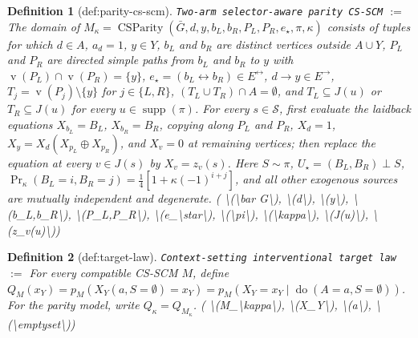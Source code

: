 \documentclass{article}
\newtheorem{definition}{Definition}
\begin{document}
\begin{definition}[def:parity-cs-scm]\label{def:parity-cs-scm}
\texttt{Two-arm selector-aware parity CS-SCM} $:=$ The domain of \(M_\kappa=\operatorname{CSParity}(\bar G,d,y,b_L,b_R,P_L,P_R,e_\star,\pi,\kappa)\) consists of tuples for which \(d\in A\), \(a_d=1\), \(y\in Y\), \(b_L\) and \(b_R\) are distinct vertices outside \(A\cup Y\), \(P_L\) and \(P_R\) are directed simple paths from \(b_L\) and \(b_R\) to \(y\) with \(\operatorname{v}(P_L)\cap\operatorname{v}(P_R)=\{y\}\), \(e_\star=(b_L\leftrightarrow b_R)\in E^{\leftrightarrow}\), \(d\to y\in E^{\to}\), \(T_j=\operatorname{v}(P_j)\setminus\{y\}\) for \(j\in\{L,R\}\), \((T_L\cup T_R)\cap A=\emptyset\), and \(T_L\subseteq J(u)\) or \(T_R\subseteq J(u)\) for every \(u\in\operatorname{supp}(\pi)\). For every \(s\in\mathcal S\), first evaluate the laidback equations \(X_{b_L}=B_L\), \(X_{b_R}=B_R\), copying along \(P_L\) and \(P_R\), \(X_d=1\), \(X_y=X_d(X_{p_L}\oplus X_{p_R})\), and \(X_v=0\) at remaining vertices; then replace the equation at every \(v\in J(s)\) by \(X_v=z_v(s)\). Here \(S\sim\pi\), \(U_\star=(B_L,B_R)\perp S\), \(\Pr_\kappa(B_L=i,B_R=j)=\tfrac14[1+\kappa(-1)^{i+j}]\), and all other exogenous sources are mutually independent and degenerate. \quad ( \textbackslash{}(\textbackslash{}bar G\textbackslash{}), \textbackslash{}(d\textbackslash{}), \textbackslash{}(y\textbackslash{}), \textbackslash{}(b\_L,b\_R\textbackslash{}), \textbackslash{}(P\_L,P\_R\textbackslash{}), \textbackslash{}(e\_\textbackslash{}star\textbackslash{}), \textbackslash{}(\textbackslash{}pi\textbackslash{}), \textbackslash{}(\textbackslash{}kappa\textbackslash{}), \textbackslash{}(J(u)\textbackslash{}), \textbackslash{}(z\_v(u)\textbackslash{}))
\end{definition}

\begin{definition}[def:target-law]\label{def:target-law}
\texttt{Context-setting interventional target law} $:=$ For every compatible CS-SCM \(M\), define \(Q_M(x_Y)=p_M(X_Y(a,S=\emptyset)=x_Y)=p_M(X_Y=x_Y\mid\operatorname{do}(A=a,S=\emptyset))\). For the parity model, write \(Q_\kappa=Q_{M_\kappa}\). \quad ( \textbackslash{}(M\_\textbackslash{}kappa\textbackslash{}), \textbackslash{}(X\_Y\textbackslash{}), \textbackslash{}(a\textbackslash{}), \textbackslash{}(\textbackslash{}emptyset\textbackslash{}))
\end{definition}
\end{document}
